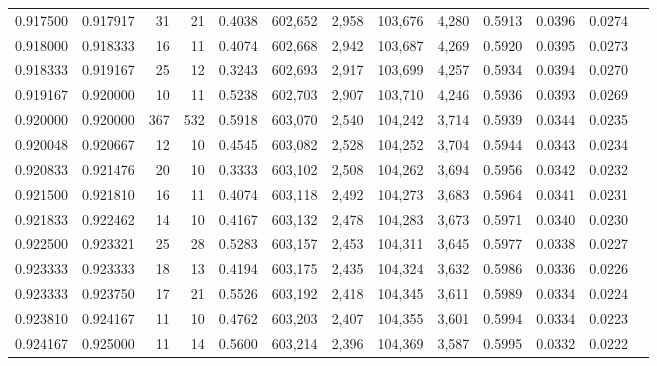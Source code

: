 \begin{tabular}{rrrrrrrrrrrrr}
0.917500 & 0.917917 &    31 &  21 &                                     0.4038 & 602,652 &   2,958 & 103,676 &   4,280 & 0.5913 & 0.0396 & 0.0274 \\
0.918000 & 0.918333 &    16 &  11 &                                     0.4074 & 602,668 &   2,942 & 103,687 &   4,269 & 0.5920 & 0.0395 & 0.0273 \\
0.918333 & 0.919167 &    25 &  12 &                                     0.3243 & 602,693 &   2,917 & 103,699 &   4,257 & 0.5934 & 0.0394 & 0.0270 \\
0.919167 & 0.920000 &    10 &  11 &                                     0.5238 & 602,703 &   2,907 & 103,710 &   4,246 & 0.5936 & 0.0393 & 0.0269 \\
0.920000 & 0.920000 &   367 & 532 &                                     0.5918 & 603,070 &   2,540 & 104,242 &   3,714 & 0.5939 & 0.0344 & 0.0235 \\
0.920048 & 0.920667 &    12 &  10 &                                     0.4545 & 603,082 &   2,528 & 104,252 &   3,704 & 0.5944 & 0.0343 & 0.0234 \\
0.920833 & 0.921476 &    20 &  10 &                                     0.3333 & 603,102 &   2,508 & 104,262 &   3,694 & 0.5956 & 0.0342 & 0.0232 \\
0.921500 & 0.921810 &    16 &  11 &                                     0.4074 & 603,118 &   2,492 & 104,273 &   3,683 & 0.5964 & 0.0341 & 0.0231 \\
0.921833 & 0.922462 &    14 &  10 &                                     0.4167 & 603,132 &   2,478 & 104,283 &   3,673 & 0.5971 & 0.0340 & 0.0230 \\
0.922500 & 0.923321 &    25 &  28 &                                     0.5283 & 603,157 &   2,453 & 104,311 &   3,645 & 0.5977 & 0.0338 & 0.0227 \\
0.923333 & 0.923333 &    18 &  13 &                                     0.4194 & 603,175 &   2,435 & 104,324 &   3,632 & 0.5986 & 0.0336 & 0.0226 \\
0.923333 & 0.923750 &    17 &  21 &                                     0.5526 & 603,192 &   2,418 & 104,345 &   3,611 & 0.5989 & 0.0334 & 0.0224 \\
0.923810 & 0.924167 &    11 &  10 &                                     0.4762 & 603,203 &   2,407 & 104,355 &   3,601 & 0.5994 & 0.0334 & 0.0223 \\
0.924167 & 0.925000 &    11 &  14 &                                     0.5600 & 603,214 &   2,396 & 104,369 &   3,587 & 0.5995 & 0.0332 & 0.0222 \\

\end{tabular}
